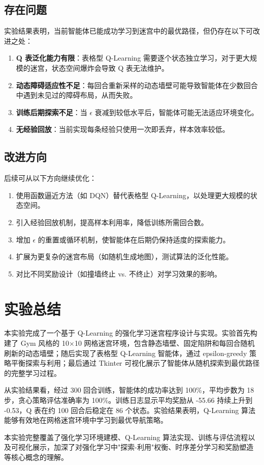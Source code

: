 \documentclass[UTF8,12pt,a4paper]{ctexart}
\begin{document}
\subsection{存在问题}
实验结果表明，当前智能体已能成功学习到迷宫中的最优路径，但仍存在以下可改进之处：
\begin{enumerate}
    \item \textbf{Q 表泛化能力有限}：表格型 Q-Learning 需要逐个状态独立学习，对于更大规模的迷宫，状态空间爆炸会导致 Q 表无法维护。
    \item \textbf{动态障碍适应性不足}：每回合重新采样的动态墙壁可能导致智能体在少数回合中遇到未见过的障碍布局，从而失败。
    \item \textbf{训练后期探索不足}：当 $\epsilon$ 衰减到较低水平后，智能体可能无法适应环境变化。
    \item \textbf{无经验回放}：当前实现每条经验只使用一次即丢弃，样本效率较低。
\end{enumerate}

\subsection{改进方向}
后续可从以下方向继续优化：
\begin{enumerate}
    \item 使用函数逼近方法（如 DQN）替代表格型 Q-Learning，以处理更大规模的状态空间。
    \item 引入经验回放机制，提高样本利用率，降低训练所需回合数。
    \item 增加 $\epsilon$ 的重置或循环机制，使智能体在后期仍保持适度的探索能力。
    \item 扩展为更复杂的迷宫布局（如随机生成地图），测试算法的泛化性能。
    \item 对比不同奖励设计（如撞墙终止 vs. 不终止）对学习效果的影响。
\end{enumerate}

\section{实验总结}

本实验完成了一个基于 Q-Learning 的强化学习迷宫程序设计与实现。实验首先构建了 Gym 风格的 10×10 网格迷宫环境，包含静态墙壁、固定陷阱和每回合随机刷新的动态墙壁；随后实现了表格型 Q-Learning 智能体，通过 epsilon-greedy 策略平衡探索与利用；最后通过 Tkinter 可视化展示了智能体从随机探索到最优路径的完整学习过程。

从实验结果看，经过 300 回合训练，智能体的成功率达到 100\%，平均步数为 18 步，贪心策略评估准确率为 100\%。训练日志显示平均奖励从 -55.66 持续上升到 -0.53，Q 表在约 100 回合后稳定在 86 个状态。实验结果表明，Q-Learning 算法能够有效地在网格迷宫环境中学习到最优导航策略。

本实验完整覆盖了强化学习环境建模、Q-Learning 算法实现、训练与评估流程以及可视化展示，加深了对强化学习中"探索-利用"权衡、时序差分学习和奖励塑造等核心概念的理解。
\end{document}
